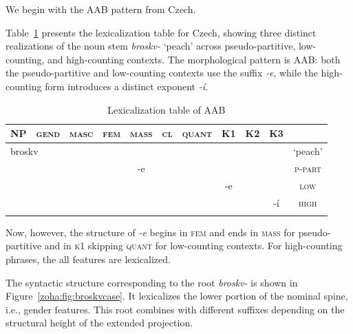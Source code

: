 \documentclass[output=paper,colorlinks,citecolor=brown
]{langscibook}
\begin{document}
\noindent We begin with the AAB pattern from Czech.

Table~\ref{zoha:tab:lexAABcase} presents the lexicalization table for Czech, showing three distinct realizations of the noun stem \textit{broskv-} ‘peach’ across pseudo-partitive, low-counting, and high-counting contexts. The morphological pattern is AAB: both the pseudo-partitive and low-counting contexts use the suffix \textit{-e}, while the high-counting form introduces a distinct exponent \textit{-í}.

\begin{table}
\begin{tabularx}{0.95\textwidth}{ccccccccccc}
\lsptoprule
\textsc{NP}&{\textsc{gend}} & {\textsc{masc}} & {\textsc{fem}} & {\textsc{mass}} & {\textsc{cl}} & {\textsc{quant}} & {\textsc{K1}} & {\textsc{K2}} & {\textsc{K3}}\\
\midrule
\multicolumn{2}{l}{\cellcolor[gray]{0.9}broskv} & {\cellcolor[gray]{0.9}} & {\cellcolor[gray]{0.9}}  & {} & {} & {} & {} & {} & {} & {`peach'}\\[.5ex]
\cellcolor[gray]{0.9} & {\cellcolor[gray]{0.9}} & {\cellcolor[gray]{0.9}} & {\cellcolor[gray]{0.8}} & {\cellcolor[gray]{0.8}-e} & {} & {} & {} & {} & {} & {\textsc{p-part}}\\[.5ex]
\cellcolor[gray]{0.9} & {\cellcolor[gray]{0.9}} & {\cellcolor[gray]{0.9}} & {\cellcolor[gray]{0.8}} & {\cellcolor[gray]{0.8}} & {\cellcolor[gray]{0.8}} & {\cellcolor{black}} & {\cellcolor[gray]{0.8}-e} & {} & {} & {\textsc{low}} \\[.5ex]
\cellcolor[gray]{0.9} & {\cellcolor[gray]{0.9}} & {\cellcolor[gray]{0.9}} & {\cellcolor[gray]{0.7}} & {\cellcolor[gray]{0.7}} & {\cellcolor[gray]{0.7}} & {\cellcolor[gray]{0.7}} & {\cellcolor[gray]{0.7}} & {\cellcolor[gray]{0.7}} & {\cellcolor[gray]{0.7}-í} & {\textsc{high}} \\[.5ex]
\lspbottomrule
\end{tabularx}
\caption{Lexicalization table of AAB}
\label{zoha:tab:lexAABcase}
\end{table}

\noindent Now, however, the structure of \textit{-e} begins in \textsc{fem} and ends in \textsc{mass} for pseudo-partitive and in \textsc{k1} skipping \textsc{quant} for low-counting contexts. For high-counting phrases, the all features are lexicalized.

The syntactic structure corresponding to the root \textit{broskv-} is shown in Figure~\ref{zoha:fig:broskvcase}. It lexicalizes the lower portion of the nominal spine, i.e., gender features. This root combines with different suffixes depending on the structural height of the extended projection.
\end{document}
